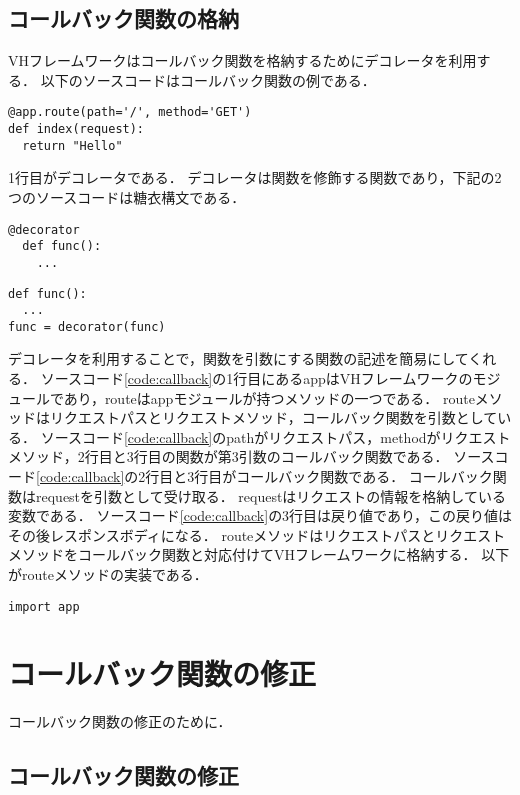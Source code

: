 \documentclass[a4paper,12pt]{jreport}
\begin{document}
\subsection{コールバック関数の格納}
VHフレームワークはコールバック関数を格納するためにデコレータを利用する．
以下のソースコードはコールバック関数の例である．
\begin{lstlisting}[caption={コールバック関数の一例}, label=code:callback, captionpos=b]
@app.route(path='/', method='GET')
def index(request):
  return "Hello"
\end{lstlisting}
1行目がデコレータである．
デコレータは関数を修飾する関数であり，下記の2つのソースコードは糖衣構文である．
\begin{lstlisting}[caption={Pythonデコレータのコード例}, label=code:decorator, captionpos=b]
@decorator
  def func():
    ...
\end{lstlisting}
\begin{lstlisting}[caption={\ref{code:decorator}と糖衣構文なソースコード例}, label=code:decorator2, captionpos=b]
def func():
  ...
func = decorator(func)
\end{lstlisting}
デコレータを利用することで，関数を引数にする関数の記述を簡易にしてくれる．
ソースコード\ref{code:callback}の1行目にあるappはVHフレームワークのモジュールであり，routeはappモジュールが持つメソッドの一つである．
routeメソッドはリクエストパスとリクエストメソッド，コールバック関数を引数としている．
ソースコード\ref{code:callback}のpathがリクエストパス，methodがリクエストメソッド，2行目と3行目の関数が第3引数のコールバック関数である．
ソースコード\ref{code:callback}の2行目と3行目がコールバック関数である．
コールバック関数はrequestを引数として受け取る．
requestはリクエストの情報を格納している変数である．
ソースコード\ref{code:callback}の3行目は戻り値であり，この戻り値はその後レスポンスボディになる．
routeメソッドはリクエストパスとリクエストメソッドをコールバック関数と対応付けてVHフレームワークに格納する．
以下がrouteメソッドの実装である．
\begin{lstlisting}[caption={routeメソッド}, label=code:route_method, captionpos=b]
import app
\end{lstlisting}

\section{コールバック関数の修正}
コールバック関数の修正のために．

\subsection{コールバック関数の修正}
\end{document}
